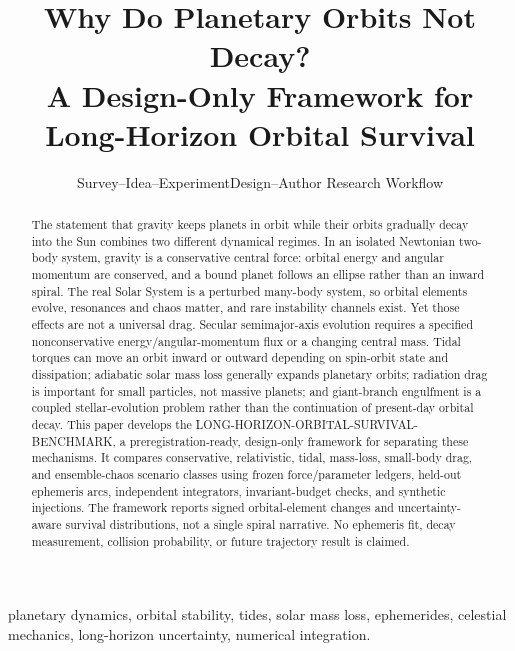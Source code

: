 \documentclass[10pt,conference]{IEEEtran}
\begin{document}
\title{Why Do Planetary Orbits Not Decay?\\
A Design-Only Framework for Long-Horizon Orbital Survival}

\author{Survey--Idea--ExperimentDesign--Author Research Workflow}

\maketitle

\begin{abstract}
The statement that gravity keeps planets in orbit while their orbits gradually decay into the Sun combines two different dynamical regimes. In an isolated Newtonian two-body system, gravity is a conservative central force: orbital energy and angular momentum are conserved, and a bound planet follows an ellipse rather than an inward spiral. The real Solar System is a perturbed many-body system, so orbital elements evolve, resonances and chaos matter, and rare instability channels exist. Yet those effects are not a universal drag. Secular semimajor-axis evolution requires a specified nonconservative energy/angular-momentum flux or a changing central mass. Tidal torques can move an orbit inward or outward depending on spin-orbit state and dissipation; adiabatic solar mass loss generally expands planetary orbits; radiation drag is important for small particles, not massive planets; and giant-branch engulfment is a coupled stellar-evolution problem rather than the continuation of present-day orbital decay. This paper develops the LONG-HORIZON-ORBITAL-SURVIVAL-BENCHMARK, a preregistration-ready, design-only framework for separating these mechanisms. It compares conservative, relativistic, tidal, mass-loss, small-body drag, and ensemble-chaos scenario classes using frozen force/parameter ledgers, held-out ephemeris arcs, independent integrators, invariant-budget checks, and synthetic injections. The framework reports signed orbital-element changes and uncertainty-aware survival distributions, not a single spiral narrative. No ephemeris fit, decay measurement, collision probability, or future trajectory result is claimed.
\end{abstract}

\begin{IEEEkeywords}
planetary dynamics, orbital stability, tides, solar mass loss, ephemerides, celestial mechanics, long-horizon uncertainty, numerical integration.
\end{IEEEkeywords}
\end{document}
